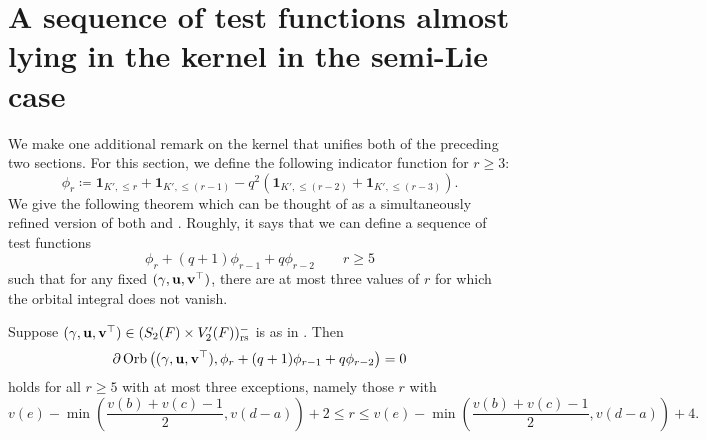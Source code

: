 \section{A sequence of test functions almost lying in the kernel in the semi-Lie case}
We make one additional remark on the kernel that unifies both of the preceding two sections.
For this section, we define the following indicator function for $r \ge 3$:
\[ \phi_r \coloneqq \mathbf{1}_{K', \le r} + \mathbf{1}_{K', \le (r-1)}
   - q^2 (\mathbf{1}_{K', \le (r-2)} + \mathbf{1}_{K', \le (r-3)}). \]
We give the following theorem which can be thought of as a simultaneously
refined version of both  and
.
Roughly, it says that we can define a sequence of test functions
\[ \phi_r + (q+1)\phi_{r-1} + q\phi_{r-2} \qquad r \ge 5 \]
such that for any fixed ${(\gamma, \mathbf u, \mathbf v^\top)}$, there are at most three values of $r$
for which the orbital integral does not vanish.
\begin{theorem}
  [A sequence in $\HH(S_2(F))$]
  \label{thm:semi_lie_finite_codim_full}
  Suppose ${(\gamma, \mathbf u, \mathbf v^\top)} \in (S_2(F) \times V_2'(F))_{\mathrm{rs}}^-$ is as in .
  Then
  \[ \partial \operatorname{Orb} \left( {(\gamma, \mathbf u, \mathbf v^\top)}, \phi_r + (q+1)\phi_{r-1} + q\phi_{r-2} \right) = 0 \]
  holds for all $r \ge 5$ with at most three exceptions,
  namely those $r$ with
  \[ v(e) - \min\left(\frac{v(b)+v(c)-1}{2}, v(d-a)\right) + 2
    \le r \le v(e) - \min\left(\frac{v(b)+v(c)-1}{2}, v(d-a)\right) + 4. \]
\end{theorem}
